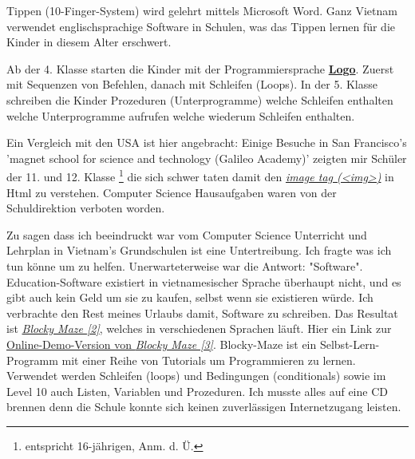 \documentclass[10pt,a4paper,ngerman,twoside]{article} %
\begin{document}
\begin{multicols}{3}
Tippen (10-Finger-System) wird gelehrt mittels Microsoft Word. Ganz Vietnam verwendet englischsprachige Software in Schulen, was das Tippen lernen für die Kinder in diesem Alter erschwert.

Ab der 4. Klasse starten die Kinder mit der Programmiersprache \href{http://de.wikipedia.org/wiki/Logo_(Programmiersprache)}{\textbf{Logo}}. Zuerst mit Sequenzen von Befehlen, danach mit Schleifen (Loops). In der 5. Klasse schreiben die Kinder Prozeduren (Unterprogramme) welche Schleifen enthalten welche Unterprogramme aufrufen welche wiederum Schleifen enthalten.

Ein Vergleich mit den USA ist hier angebracht: Einige Besuche in San Francisco's 'magnet school for science and technology (Galileo Academy)' zeigten mir Schüler der 11. und 12. Klasse \footnote{entspricht 16-jährigen, Anm. d. Ü.} die sich schwer taten damit den \href{http://de.selfhtml.org/html/grafiken/einbinden.htm#referenz}{\textit{image tag (<img>)}} in Html zu verstehen. Computer Science Hausaufgaben waren von der Schuldirektion verboten worden.

Zu sagen dass ich beeindruckt war vom Computer Science Unterricht und Lehrplan in Vietnam's Grundschulen ist eine Untertreibung. Ich fragte was ich tun könne um zu helfen. Unerwarteterweise war die Antwort: "Software". Education-Software existiert in vietnamesischer Sprache überhaupt nicht, und es gibt auch kein Geld um sie zu kaufen, selbst wenn sie existieren würde.  Ich verbrachte den Rest meines Urlaubs damit, Software zu schreiben. Das Resultat ist \href{https://code.google.com/p/blockly/}{\textit{Blocky Maze [2]}}, welches in verschiedenen Sprachen läuft. Hier ein Link zur \href{http://blockly-demo.appspot.com/static/apps/maze/en.html?level=1}{Online-Demo-Version von \textit{Blocky Maze [3]}}. Blocky-Maze ist ein Selbst-Lern-Programm mit einer Reihe von Tutorials um Programmieren zu lernen. Verwendet werden Schleifen (loops) und Bedingungen (conditionals) sowie im Level 10 auch Listen, Variablen und Prozeduren. Ich musste alles auf eine CD brennen denn die Schule konnte sich keinen zuverlässigen Internetzugang leisten.


\end{multicols}
\end{document}
